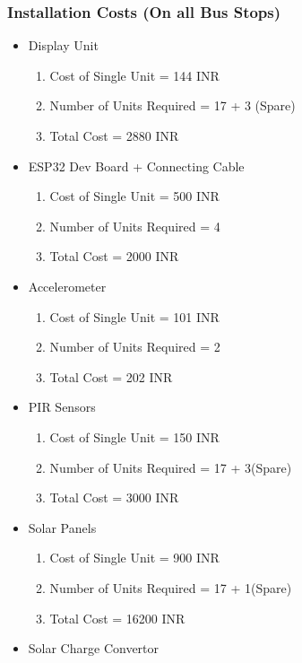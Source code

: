 \documentclass[12pt]{article} %
\begin{document}
\subsubsection{Installation Costs (On all Bus Stops)}
\begin{itemize}
    \item Display Unit
    \begin{enumerate}
        \item Cost of Single Unit = 144 INR
        \item Number of Units Required = 17 + 3 (Spare)
        \item Total Cost = 2880 INR
    \end{enumerate}
    \item \gls{ESP32} Dev Board + Connecting Cable
    \begin{enumerate}
        \item Cost of Single Unit = 500 INR
        \item Number of Units Required = 4
        \item Total Cost = 2000 INR
    \end{enumerate}
    \item \gls{Accelerometer}
    \begin{enumerate}
        \item Cost of Single Unit = 101 INR
        \item Number of Units Required = 2
        \item Total Cost = 202 INR
    \end{enumerate}
    \item PIR Sensors
    \begin{enumerate}
        \item Cost of Single Unit = 150 INR
        \item Number of Units Required = 17 + 3(Spare)
        \item Total Cost = 3000 INR
    \end{enumerate}
    \item Solar Panels
    \begin{enumerate}
        \item Cost of Single Unit = 900 INR
        \item Number of Units Required = 17 + 1(Spare)
        \item Total Cost = 16200 INR
    \end{enumerate}
    \item Solar Charge Convertor\cite{technology_pwm_2021}

\end{itemize}
\end{document}
